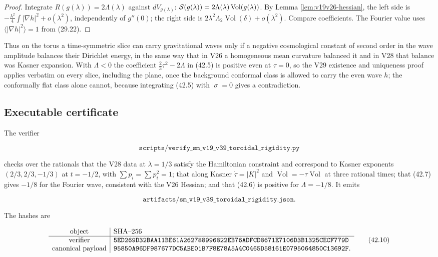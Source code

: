 \documentclass[11pt]{article}
\theoremstyle{remark}
\begin{document}
\begin{proof}
Integrate \(R(g(\lambda))=2\Lambda(\lambda)\) against \(dV_{g(\lambda)}\):
\({\cal S}(g(\lambda))=2\Lambda(\lambda)\operatorname{Vol}(g(\lambda))\).
By Lemma \ref{lem:v19v26-hessian}, the left side is
\(-\tfrac{\lambda^2}4\int|\nabla h|^2+o(\lambda^2)\), independently of
\(g''(0)\); the right side is
\(2\lambda^2\Lambda_2\operatorname{Vol}(\delta)+o(\lambda^2)\).  Compare
coefficients.  The Fourier value uses \(\langle|\nabla h|^2\rangle=1\)
from (29.22).
\end{proof}

Thus on the torus a time-symmetric slice can carry gravitational waves
only if a negative cosmological constant of second order in the wave
amplitude balances their Dirichlet energy, in the same way that in V26
a homogeneous mean curvature balanced it and in V28 that balance was
Kasner expansion.  With \(\Lambda<0\) the coefficient
\(\tfrac23\tau^2-2\Lambda\) in (42.5) is positive even at \(\tau=0\), so
the V29 existence and uniqueness proof applies verbatim on every slice,
including the plane, once the background conformal class is allowed to
carry the even wave \(h\); the conformally flat class alone cannot,
because integrating (42.5) with \(|\sigma|=0\) gives a contradiction.

\subsection{Executable certificate}

The verifier

\[
 \texttt{scripts/verify\_sm\_v19\_v39\_toroidal\_rigidity.py}        \tag{42.8}
\]

checks over the rationals that the V28 data at \(\lambda=1/3\) satisfy
the Hamiltonian constraint and correspond to Kasner exponents
\((2/3,2/3,-1/3)\) at \(t=-1/2\), with \(\sum p_i=\sum p_i^2=1\); that
along Kasner \(\dot\tau=|K|^2\) and
\(\dot{\operatorname{Vol}}=-\tau\operatorname{Vol}\) at three rational
times; that (42.7) gives \(-1/8\) for the Fourier wave, consistent with
the V26 Hessian; and that (42.6) is positive for \(\Lambda=-1/8\).  It
emits

\[
 \texttt{artifacts/sm\_v19\_v39\_toroidal\_rigidity.json}.           \tag{42.9}
\]

The hashes are

\[
\begin{array}{c|l}
\hbox{object}&\hbox{SHA--256}\\ \hline
\hbox{verifier}&
\texttt{5ED269D32BAA11BE61A262788996822EB76ADFCD8671E7106D3B1325CECF779D}\\
\hbox{canonical payload}&
\texttt{95850A96DF987677DC5ABE01B7F8E78A5A4C0465D58161E0795064850C13692F}.
\end{array}                                                     \tag{42.10}
\]
\end{document}
